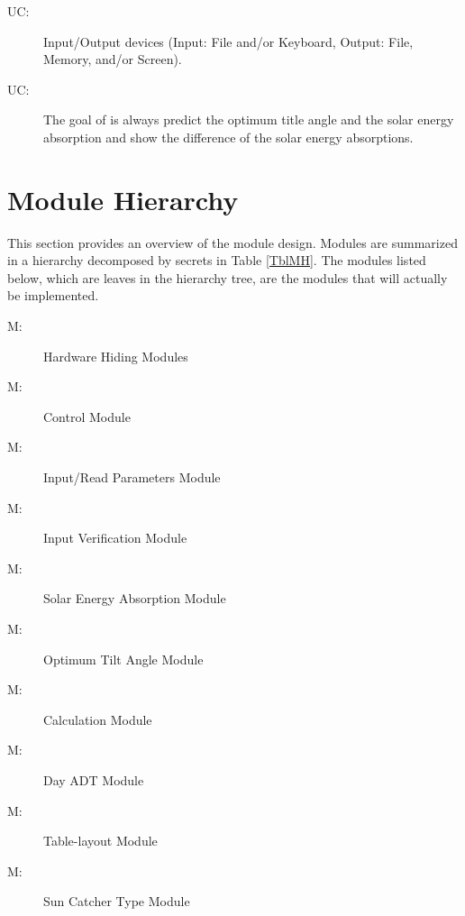 \documentclass[12pt, titlepage]{article}
\newcounter{ucnum}
\newcommand{\uctheucnum}{UC\theucnum}
\newcounter{mnum}
\newcommand{\mthemnum}{M\themnum}
\begin{document}
\begin{description}
\item[ \uctheucnum \label{ucIO}:] Input/Output devices
  (Input: File and/or Keyboard, Output: File, Memory, and/or Screen).
\item[ \uctheucnum \label{ucIO}:] The goal of \progname
is always predict the optimum title angle and the solar energy absorption and show the difference of the solar energy absorptions.
\end{description}

\section{Module Hierarchy} \label{SecMH}

This section provides an overview of the module design. Modules are summarized
in a hierarchy decomposed by secrets in Table \ref{TblMH}. The modules listed
below, which are leaves in the hierarchy tree, are the modules that will
actually be implemented.

\begin{description}
\item [ \mthemnum \label{mHH}:] Hardware Hiding Modules
\item [ \mthemnum \label{mC}:] Control Module
\item [ \mthemnum \label{mIP}:] Input/Read Parameters Module
\item [ \mthemnum \label{mIV}:] Input Verification Module
\item [ \mthemnum \label{mSEA}:] Solar Energy Absorption Module
\item [ \mthemnum \label{mOTA}:] Optimum Tilt Angle Module
\item [ \mthemnum \label{mCal}:] Calculation Module
\item [ \mthemnum \label{mDD}:] Day ADT Module
\item [ \mthemnum \label{mT}:] Table-layout Module
\item [ \mthemnum \label{mSCT}:] Sun Catcher Type Module
\end{description}
\end{document}
